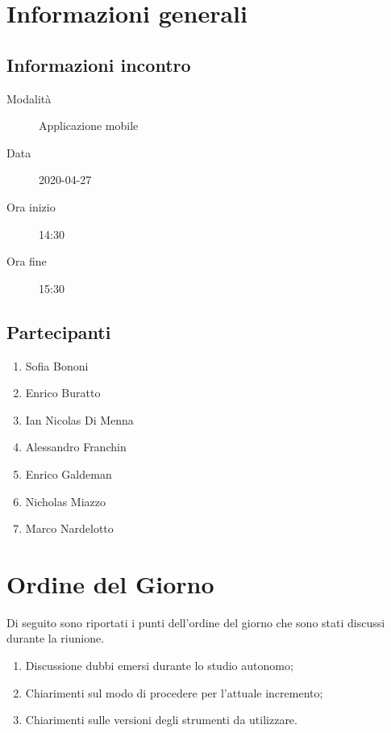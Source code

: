 \documentclass{article}
\begin{document}


\section{Informazioni generali}%
\label{sec:informazioni_generali}

\subsection{Informazioni incontro}%
\label{sub:informazioni_incontro}

\begin{description}
  \item[Modalità] Applicazione mobile 
  \item[Data] 2020-04-27
  \item[Ora inizio] 14:30
  \item[Ora fine] 15:30
\end{description}

\subsection{Partecipanti}%
\label{sub:partecipanti}

\begin{enumerate}
  \item Sofia Bononi
  \item Enrico Buratto
  \item Ian Nicolas Di Menna
  \item Alessandro Franchin
  \item Enrico Galdeman
  \item Nicholas Miazzo
  \item Marco Nardelotto
\end{enumerate}

\section{Ordine del Giorno}%
\label{ordine_del_giorno}
Di seguito sono riportati i punti dell'ordine del giorno che sono stati discussi durante la riunione.
\begin{enumerate}
  \item Discussione dubbi emersi durante lo studio autonomo;
  \item Chiarimenti sul modo di procedere per l'attuale incremento;
  \item Chiarimenti sulle versioni degli strumenti da utilizzare.
\end{enumerate}
\end{document}
